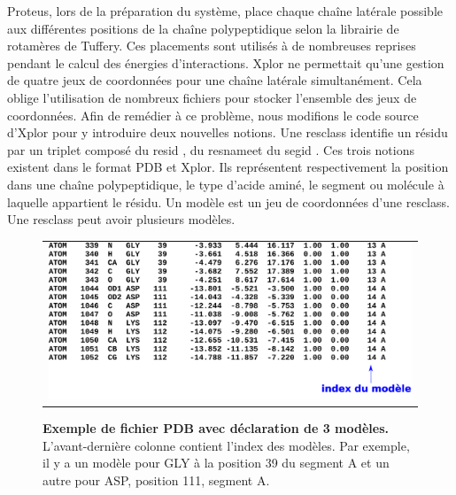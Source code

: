 Proteus, lors de la préparation du système, place chaque chaîne latérale possible aux différentes positions de la chaîne polypeptidique selon la librairie de rotamères de Tuffery. Ces placements sont utilisés à de nombreuses reprises pendant le calcul des énergies d'interactions. Xplor ne permettait qu'une gestion de quatre jeux de coordonnées pour une chaîne latérale simultanément. Cela oblige l'utilisation de nombreux fichiers pour stocker l'ensemble des jeux de coordonnées. Afin de remédier à ce problème, nous modifions le code source d'Xplor pour y introduire deux nouvelles notions. Une \og resclass \fg identifie un résidu par un triplet composé du \og resid \fg, du \og resname\fg et du \og segid \fg. Ces trois notions existent dans le format PDB et Xplor. Ils représentent respectivement la position dans une chaîne polypeptidique, le type d'acide aminé, le segment ou molécule à laquelle appartient le résidu. Un \og modèle \fg est un jeu de coordonnées d'une resclass. Une resclass peut avoir plusieurs modèles.
   \begin{figure}[!htbp]
     \centering
     \begin{tabular}{c}
       \includegraphics[width=13cm]{figure/PDB.pdf} 
     \end{tabular}     
     \caption{\textbf{Exemple de fichier PDB avec déclaration de 3 modèles.} L'avant-dernière colonne contient l'index des modèles. Par exemple, il y a un modèle pour GLY à la position 39 du segment A et un autre pour ASP, position 111, segment A.}
\label{fig:PDB}
   \end{figure}
 
